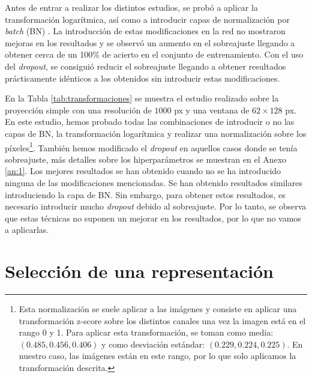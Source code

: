 \documentclass[a4paper,12pt,oneside,titlepage]{book}
\begin{document}
Antes de entrar a realizar los distintos estudios, se probó a aplicar la transformación logarítmica, así como a introducir capas de normalización por \textit{batch} (BN) \cite{batchnorm}. La introducción de estas modificaciones en la red no mostraron mejoras en los resultados y se observó un aumento en el sobreajuste llegando a obtener cerca de un 100\% de acierto en el conjunto de entrenamiento. Con el uso del \textit{dropout}, se consiguió reducir el sobreajuste llegando a obtener resultados prácticamente idénticos a los obtenidos sin introducir estas modificaciones.

En la Tabla \ref{tab:transformaciones} se muestra el estudio realizado sobre la proyección simple con una resolución de $1000$ px y una ventana de $62\times128$ px. En este estudio, hemos probado todas las combinaciones de introducir o no las capas de BN, la transformación logarítmica y realizar una normalización sobre los píxeles\footnote{Esta normalización se suele aplicar a las imágenes y consiste en aplicar una transformación z-score sobre los distintos canales una vez la imagen está en el rango 0 y 1. Para aplicar esta transformación, se toman como media: $(0.485, 0.456, 0.406)$ y como desviación estándar: $(0.229, 0.224, 0.225)$. En nuestro caso, las imágenes están en este rango, por lo que solo aplicamos la transformación descrita.}. También hemos modificado el \textit{dropout} en aquellos casos donde se tenía sobreajuste, más detalles sobre los hiperparámetros se muestran en el Anexo \ref{an:1}. Los mejores resultados se han obtenido cuando no se ha introducido ninguna de las modificaciones mencionadas. Se han obtenido resultados similares introduciendo la capa de BN. Sin embargo, para obtener estos resultados, es necesario introducir mucho \textit{dropout} debido al sobreajuste. Por lo tanto, se observa que estas técnicas no suponen un mejorar en los resultados, por lo que no vamos a aplicarlas.


\section{Selección de una representación}
\end{document}
